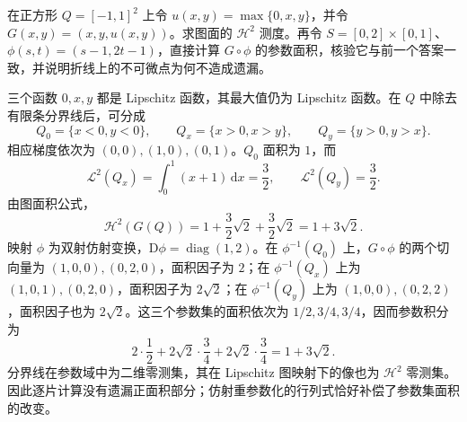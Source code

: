 \begin{exercise}\label{g3:ex:piecewise-linear-graph-area}
	在正方形 \(Q=[-1,1]^2\) 上令 \(u(x,y)=\max\{0,x,y\}\)，并令 \(G(x,y)=(x,y,u(x,y))\)。求图面的 \(\mathcal H^2\) 测度。再令 \(S=[0,2]\times[0,1]\)、\(\phi(s,t)=(s-1,2t-1)\)，直接计算 \(G\circ\phi\) 的参数面积，核验它与前一个答案一致，并说明折线上的不可微点为何不造成遗漏。
\end{exercise}
\begin{solution}
	三个函数 \(0,x,y\) 都是 Lipschitz 函数，其最大值仍为 Lipschitz 函数。在 \(Q\) 中除去有限条分界线后，可分成
	\[
		Q_0=\{x<0,y<0\},\qquad
		Q_x=\{x>0,x>y\},\qquad
		Q_y=\{y>0,y>x\}.
	\]
	相应梯度依次为 \((0,0),(1,0),(0,1)\)。\(Q_0\) 面积为 \(1\)，而
	\[
		\mathcal L^2(Q_x)=\int_0^1(x+1)\,\mathrm dx=\frac32,
		\qquad\mathcal L^2(Q_y)=\frac32.
	\]
	由图面积公式，
	\[
		\mathcal H^2(G(Q))=1+\frac32\sqrt2+\frac32\sqrt2=1+3\sqrt2.
	\]
	映射 \(\phi\) 为双射仿射变换，\(\mathrm D\phi=\operatorname{diag}(1,2)\)。在 \(\phi^{-1}(Q_0)\) 上，\(G\circ\phi\) 的两个切向量为 \((1,0,0),(0,2,0)\)，面积因子为 \(2\)；在 \(\phi^{-1}(Q_x)\) 上为 \((1,0,1),(0,2,0)\)，面积因子为 \(2\sqrt2\)；在 \(\phi^{-1}(Q_y)\) 上为 \((1,0,0),(0,2,2)\)，面积因子也为 \(2\sqrt2\)。这三个参数集的面积依次为 \(1/2,3/4,3/4\)，因而参数积分为
	\[
		2\cdot\frac12+2\sqrt2\cdot\frac34+2\sqrt2\cdot\frac34=1+3\sqrt2.
	\]
	分界线在参数域中为二维零测集，其在 Lipschitz 图映射下的像也为 \(\mathcal H^2\) 零测集。因此逐片计算没有遗漏正面积部分；仿射重参数化的行列式恰好补偿了参数集面积的改变。
\end{solution}


